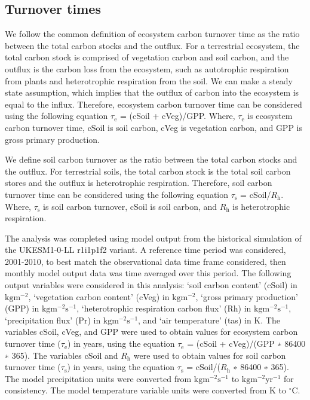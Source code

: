 \documentclass[bg, manuscript]{copernicus}
\begin{document}
\subsection{Turnover times}
We follow the common definition of ecosystem carbon turnover time as the ratio between the total carbon stocks and the outflux. For a terrestrial ecosystem, the total carbon stock is comprised of vegetation carbon and soil carbon, and the outflux is the carbon loss from the ecosystem, such as autotrophic respiration from plants and heterotrophic respiration from the soil. We can make a steady state assumption, which implies that the outflux of carbon into the ecosystem is equal to the influx.  Therefore, ecosystem carbon turnover time can be considered using the following equation $\tau_\mathrm{e}$ = (cSoil + cVeg)/GPP. Where, $\tau_\mathrm{e}$ is ecosystem carbon turnover time, cSoil is soil carbon, cVeg is vegetation carbon, and GPP is gross primary production.

We define soil carbon turnover as the ratio between the total carbon stocks and the outflux. For terrestrial soils, the total carbon stock is the total soil carbon stores and the outflux is heterotrophic respiration. Therefore, soil carbon turnover time can be considered using the following equation $\tau_\mathrm{s}$ = cSoil/$R_\mathrm{h}$. Where, $\tau_\mathrm{s}$ is soil carbon turnover, cSoil is soil carbon, and $R_\mathrm{h}$ is heterotrophic respiration.

The analysis was completed using model output from the historical simulation of the UKESM1-0-LL r1i1p1f2 variant. A reference time period was considered, 2001-2010, to best match the observational data time frame considered, then monthly model output data was time averaged over this period. The following output variables were considered in this analysis: ‘soil carbon content’ (cSoil) in $\mathrm{kg} \mathrm{m}^{−2}$, ‘vegetation carbon content’ (cVeg) in $\mathrm{kg} \mathrm{m}^{−2}$, ‘gross primary production’ (GPP) in $\mathrm{kg} \mathrm{m}^{−2} \mathrm{s}^{−1}$,  ‘heterotrophic respiration carbon flux’ (Rh) in $\mathrm{kg} \mathrm{m}^{−2} \mathrm{s}^{−1}$, ‘precipitation flux’ (Pr) in $\mathrm{kg} \mathrm{m}^{−2} \mathrm{s}^{−1}$, and ‘air temperature’ (tas) in K.
The variables cSoil, cVeg, and GPP were used to obtain values for ecosystem carbon turnover time ($\tau_\mathrm{e}$) in years, using the equation $\tau_\mathrm{e}$ = (cSoil + cVeg)/(GPP ∗ 86400 ∗ 365). The variables cSoil and $R_\mathrm{h}$ were used to obtain values for soil carbon turnover time ($\tau_\mathrm{s}$) in years, using the equation $\tau_\mathrm{s}$ = cSoil/($R_\mathrm{h}$ ∗ 86400 ∗ 365). The model precipitation units were converted from $\mathrm{kg} \mathrm{m}^{−2} \mathrm{s}^{−1}$ to $\mathrm{kg} \mathrm{m}^{−2} \mathrm{yr}^{−1}$ for consistency. The model temperature variable units were converted from K to $^\circ$C. 
\end{document}
